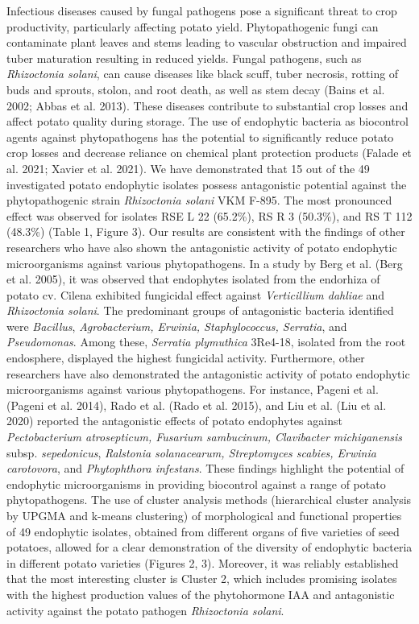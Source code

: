 \documentclass[sn-mathphys,Numbered]{sn-jnl}%
\theoremstyle{thmstyleone}%
\theoremstyle{thmstyletwo}%
\theoremstyle{thmstylethree}%
\begin{document}
Infectious diseases caused by fungal pathogens pose a significant threat to crop productivity, particularly affecting potato yield. Phytopathogenic fungi can contaminate plant leaves and stems leading to vascular obstruction and impaired tuber maturation resulting in reduced yields. Fungal pathogens, such as \textit{Rhizoctonia solani}, can cause diseases like black scuff, tuber necrosis, rotting of buds and sprouts, stolon, and root death, as well as stem decay (Bains et al. 2002; Abbas et al. 2013). These diseases contribute to substantial crop losses and affect potato quality during storage.
The use of endophytic bacteria as biocontrol agents against phytopathogens has the potential to significantly reduce potato crop losses and decrease reliance on chemical plant protection products (Falade et al. 2021; Xavier et al. 2021).
We have demonstrated that 15 out of the 49 investigated potato endophytic isolates possess antagonistic potential against the phytopathogenic strain \textit{Rhizoctonia solani} VKM F-895. The most pronounced effect was observed for isolates RSE L 22 (65.2\%), RS R 3 (50.3\%), and RS T 112 (48.3\%) (Table 1, Figure 3). Our results are consistent with the findings of other researchers who have also shown the antagonistic activity of potato endophytic microorganisms against various phytopathogens. In a study by Berg et al.  (Berg et al.  2005), it was observed that endophytes isolated from the endorhiza of potato cv. Cilena exhibited fungicidal effect against  \textit{Verticillium dahliae} and \textit{Rhizoctonia solani}. The predominant groups of antagonistic bacteria identified were \textit{Bacillus}, \textit{Agrobacterium, Erwinia, Staphylococcus, Serratia}, and \textit{Pseudomonas}. Among these, \textit{Serratia plymuthica} 3Re4-18, isolated from the root endosphere, displayed the highest fungicidal activity. Furthermore, other researchers have also demonstrated the antagonistic activity of potato endophytic microorganisms against various phytopathogens. For instance, Pageni et al.  (Pageni et al.  2014), Rado et al.  (Rado et al.  2015), and Liu et al.  (Liu et al. 2020) reported the antagonistic effects of potato endophytes against \textit{Pectobacterium atrosepticum, Fusarium sambucinum, Clavibacter michiganensis} subsp. \textit{sepedonicus}, \textit{Ralstonia solanacearum, Streptomyces scabies, Erwinia carotovora}, and \textit{Phytophthora infestans}. These findings highlight the potential of endophytic microorganisms in providing biocontrol against a range of potato phytopathogens.
The use of cluster analysis methods (hierarchical cluster analysis by UPGMA and k-means clustering) of morphological and functional properties of 49 endophytic isolates, obtained from different organs of five varieties of seed potatoes, allowed for a clear demonstration of the diversity of endophytic bacteria in different potato varieties (Figures 2, 3). Moreover, it was reliably established that the most interesting cluster is Cluster 2, which includes promising isolates with the highest production values of the phytohormone IAA and antagonistic activity against the potato pathogen \textit{Rhizoctonia solani}.
\end{document}
